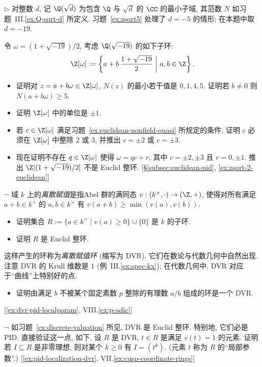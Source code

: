 \begin{prob}
\label{ex:zd19-not-euclidean}
$\triangleright$ 对整数 $d$, 记 $\Q(\sqrt{d})$ 为包含 $\Q$ 与 $\sqrt{d}$ 的 $\CC$ 的最小子域, 其范数 $N$ 如习题~III.\ref{ex:Q-sqrt-d} 所定义. 习题~\ref{ex:zsqrt5} 处理了 $d=-5$ 的情形; 在本题中取 $d=-19$.

\noindent 令 $\omega=(1+\sqrt{-19})/2$, 考虑 $\Q(\sqrt{-19})$ 的如下子环:
\[
\Z[\omega] := \left\{a+b\,\frac{1+\sqrt{-19}}{2}\ \middle|\ a,b\in\Z\right\}.
\]
\begin{itemize}
\item 证明对 $z=a+b\omega\in \Z[\omega]$, $N(z)$ 的最小若干值是 $0,1,4,5$. 证明若 $b\neq 0$ 则 $N(a+b\omega)\ge 5$.
\item 证明 $\Z[\omega]$ 中的单位是 $\pm 1$.
\item 若 $c\in \Z[\omega]$ 满足习题~\ref{ex:euclidean-nonfield-quasi} 所规定的条件, 证明 $c$ 必须在 $\Z[\omega]$ 中整除 $2$ 或 $3$, 并推出 $c=\pm 2$ 或 $c=\pm 3$.
\item 现在证明不存在 $q\in \Z[\omega]$ 使得 $\omega=qc+r$, 其中 $c=\pm 2,\pm 3$ 且 $r=0,\pm 1$. 推出 $\Z[(1+\sqrt{-19})/2]$ 不是 Euclid 整环. [§\ref{subsec:euclidean-pid}, \ref{ex:zsqrt-2-euclidean}]
\end{itemize}
\end{prob}

\begin{prob}
\label{ex:discrete-valuation}
$\neg$ 域 $k$ 上的\emph{离散赋值}是指Abel 群的满同态 $v:(k^\times,\cdot)\to (\Z,+)$, 使得对所有满足 $a+b\in k^\times$ 的 $a,b\in k^\times$ 有 $v(a+b)\ge \min(v(a),v(b))$.
\begin{itemize}
\item 证明集合 $R:=\{a\in k^\times\mid v(a)\ge 0\}\cup\{0\}$ 是 $k$ 的子环.
\item 证明 $R$ 是 Euclid 整环.
\end{itemize}
这样产生的环称为\emph{离散赋值环} (缩写为 DVR). 它们在数论与代数几何中自然出现. 注意 DVR 的 Krull 维数是 $1$ (例~III.\ref{ex:spec-kx}); 在代数几何中, DVR 对应于``曲线''上特别好的点.
\begin{itemize}
\item 证明由满足 $b$ 不被某个固定素数 $p$ 整除的有理数 $a/b$ 组成的环是一个 DVR.
\end{itemize}
[\ref{ex:dvr-pid-localparam}, VIII.\ref{ex:p-adic}]
\end{prob}

\begin{prob}
\label{ex:dvr-pid-localparam}
$\neg$ 如习题~\ref{ex:discrete-valuation} 所见, DVR 是 Euclid 整环. 特别地, 它们必是 PID. 直接验证这一点, 如下. 设 $R$ 是 DVR, $t\in R$ 是满足 $v(t)=1$ 的元素. 证明若 $I\subseteq R$ 是非零理想, 则对某个 $k\ge 0$ 有 $I=(t^k)$. (元素 $t$ 称为 $R$ 的``局部参数''.) [\ref{ex:pid-localization-dvr}, VII.\ref{ex:cusp-coordinate-rings}]
\end{prob}

